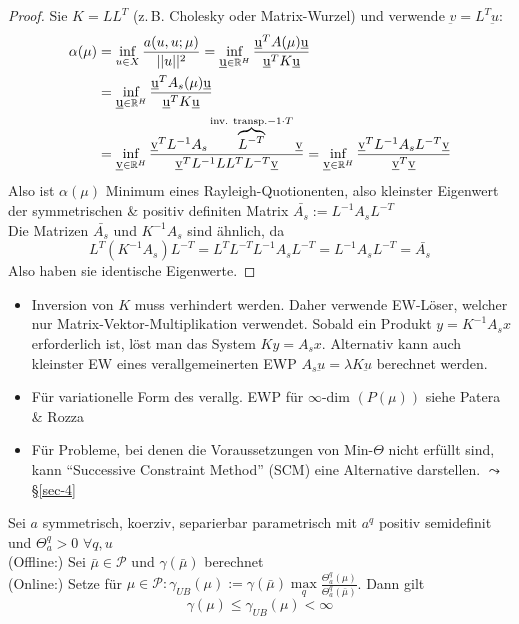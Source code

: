 \begin{proof}
	Sie $K = L L^T$ (z.\,B. Cholesky oder Matrix-Wurzel) und verwende $\underbar v = L^T \underbar u$:
	\begin{align*}
		\alpha (\mu) &= \inf\limits_{u \in X} \frac{a(u,u;\mu)}{||u||^2} = \inf\limits_{\underbar u \in \mathbb{R}^H} \frac{\underbar u^T A(\mu) \underbar u}{\underbar u^T K \underbar u} \\
		&= \inf\limits_{\underbar u \in \mathbb{R}^H} \frac{\underbar u^T A_s(\mu) \underbar u}{\underbar u^T K \underbar u} \\
		&= \inf\limits_{\underbar v \in \mathbb{R}^H} \frac{\underbar v^T L^{-1} A_s \overbrace{L^{-T}}^{\text{inv. transp.} -1 \cdot T} \underbar v}{\underbar v^T L^{-1} L L^T L^{-T} \underbar v} = \inf\limits_{\underbar v \in \mathbb{R}^H} \frac{\underbar v^T L^{-1} A_s L^{-T} \underbar v}{\underbar v^T \underbar v}
	\end{align*}
	Also ist $\alpha(\mu)$ Minimum eines Rayleigh-Quotionenten, also kleinster Eigenwert der symmetrischen \& positiv definiten Matrix $\bar{A_s} := L^{-1} A_s L^{-T}$ \\
	Die Matrizen $\bar{A_s}$ und $K^{-1} A_s$ sind ähnlich, da 
	\[
		L^T(K^{-1}A_s)L^{-T} = L^T L^{-T}L^{-1}A_sL^{-T} = L^{-1}A_sL^{-T} = \bar{A_s}
	\]
	Also haben sie identische Eigenwerte.
\end{proof}

\begin{bem} \beginwithlistbem
	\begin{itemize}
		\item Inversion von $K$ muss verhindert werden. Daher verwende EW-Löser, welcher nur Matrix-Vektor-Multiplikation verwendet. Sobald ein Produkt $y=K^{-1}A_s x$ erforderlich ist, löst man das System $Ky = A_s x$. Alternativ kann auch kleinster EW eines verallgemeinerten EWP $A_s \underbar u = \lambda K \underbar u$ berechnet werden.
		\item Für variationelle Form des verallg. EWP für $\infty$-dim $(P(\mu))$ siehe Patera \& Rozza
		\item Für Probleme, bei denen die Voraussetzungen von Min-$\Theta$ nicht erfüllt sind, kann ``Successive Constraint Method'' (SCM) eine Alternative darstellen.  $\leadsto$ §\ref{sec-4}
	\end{itemize}
\end{bem}

\begin{satz}
	Sei $a$ symmetrisch, koerziv, separierbar parametrisch mit $a^q$ positiv semidefinit und $\Theta_a^q > 0 \, \, \forall q,u$ \\
	(Offline:) Sei $\bar{\mu} \in \mathcal{P}$ und $\gamma(\bar{\mu})$ berechnet \\
	(Online:) Setze für $\mu \in \mathcal{P}: \gamma_{UB}(\mu) := \gamma(\bar{\mu}) \max\limits_q \frac{\Theta_a^q(\mu)}{\Theta_a^q(\bar{\mu})}$. Dann gilt 
	\[
		\gamma(\mu) \leq \gamma_{UB} (\mu) < \infty
	\]
\end{satz}

